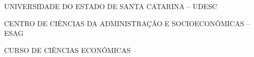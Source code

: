 

\renewcommand{\imprimircapa}{%
	\begin{capa}%
		\center

		{\fontseries{b}\selectfont\MakeTextUppercase{UNIVERSIDADE DO ESTADO DE SANTA CATARINA -- UDESC}}
		
		{\fontseries{b}\selectfont\MakeTextUppercase{CENTRO DE CIÊNCIAS DA ADMINISTRAÇÃO E SOCIOECONÔMICAS -- ESAG  }}
		
		{\fontseries{b}\selectfont\MakeTextUppercase{CURSO DE CIÊNCIAS ECONÔMICAS}}
		
		\vfill
		
		{\fontseries{b}\selectfont\MakeTextUppercase{\normalsize\imprimirautor}}
		
		\vfill
		\begin{center}
			{\fontseries{b}\selectfont\MakeTextUppercase{\imprimirtitulo}}
		\end{center}
		\vfill
		
		\vfill
		
		{\fontseries{b}\selectfont\MakeTextUppercase{\imprimirlocal}}
		\par
		{\selectfont \imprimirdata}
		\vspace*{1cm}
	\end{capa}
}



\imprimircapa				%

